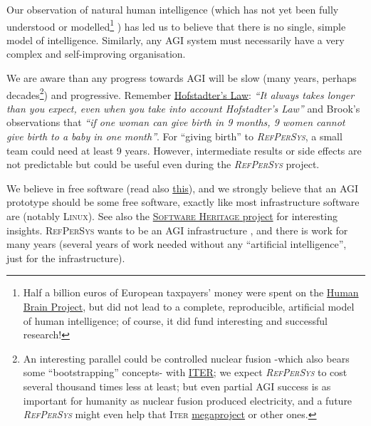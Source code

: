 \documentclass[11pt,a4paper,svgnames]{article}
\newcommand{\RefPerSys}{{\textit{\textsc{RefPerSys}}}}
\begin{document}
Our observation of natural human intelligence (which has not yet been fully
understood or modelled\footnote{
    Half a billion euros of European taxpayers' money were spent on the
    \href{https://www.humanbrainproject.eu}{Human Brain Project}, but did not
    lead to a complete, reproducible, artificial model of human intelligence;
    of course, it did fund interesting and successful research!
}
) has led us to believe that there is no single, simple model of intelligence. 
Similarly, any AGI system must necessarily have a very complex and self-improving
organisation.

We are aware than any progress towards AGI will be slow (many years,
perhaps decades\footnote{An interesting parallel could be controlled
  nuclear fusion -which also bears some ``bootstrapping'' concepts-
  with \href{https://en.wikipedia.org/wiki/ITER}{\textsc{ITER}}; we
  expect {\RefPerSys} to cost several thousand times less at least;
  but even partial AGI success is as important for humanity as nuclear
  fusion produced electricity, and a future {\RefPerSys} might even
  help that \textsc{Iter}
  \href{https://en.wikipedia.org/wiki/Megaproject}{megaproject} or
  other ones.}) and progressive. Remember
  \href{https://en.wikipedia.org/wiki/Hofstadter's_law}{Hofstadter's
    Law}: \textit{``It always takes longer than you expect, even when
    you take into account Hofstadter's Law''}
  \cite{Hofstadter:1979:GEB} and Brook's observations
  \cite{Brooks:1987:NSB, Brooks:1995:MM} that \emph{``if one woman can give
  birth in 9 months, 9 women cannot give birth to a baby in one
  month''}. For ``giving birth'' to {\RefPerSys}, a small team could
  need at least 9 years. However, intermediate results or side effects
  are not predictable but could be useful even during the {\RefPerSys}
  project.

We believe in free software  (read also
\href{https://www.fsf.org/about/what-is-free-software}{this}), and we
strongly believe that an AGI prototype should be some free software,
exactly like most infrastructure software are (notably
\textsc{Linux}). See also the
\href{https://www.softwareheritage.org/}{\textsc{Software Heritage}
  project}  for interesting insights. \textsc{RefPerSys} wants to be an
AGI infrastructure , and there is work for many years (several years of
work needed without any ``artificial intelligence'', just for the
infrastructure).
\end{document}
